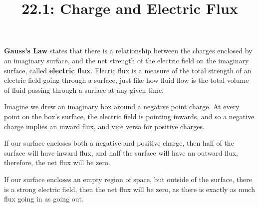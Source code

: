 \documentclass{article}
\title{22.1: Charge and Electric Flux}
\begin{document}
\maketitle

\begin{definition}
\textbf{Gauss's Law} states that there is a relationship between the charges enclosed by an imaginary surface, and the net strength of the electric field on the imaginary surface, called \textbf{electric flux}. Elecric flux is a measure of the total strength of an electric field going through a surface, just like how fluid flow is the total volume of fluid passing through a surface at any given time.
\end{definition}

\begin{example}
Imagine we drew an imaginary box around a negative point charge. At every point on the box's surface, the electric field is pointing inwards, and so a negative charge implies an inward flux, and vice versa for positive charges.

If our surface encloses both a negative and positive charge, then half of the surface will have inward flux, and half the surface will have an outward flux, therefore, the net flux will be zero.

If our surface encloses an empty region of space, but outside of the surface, there is a strong electric field, then the net flux will be zero, as there is exactly as much flux going in as going out. 
\end{example}
\end{document}
